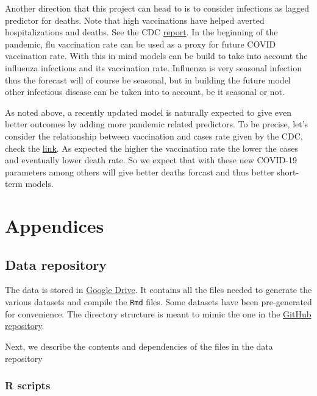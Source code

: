 \documentclass[
]{article}
\begin{document}
Another direction that this project can head to is to consider
infections as lagged predictor for deaths. Note that high vaccinations
have helped averted hospitalizations and deaths. See the CDC
\href{https://www.cdc.gov/flu/about/burden-averted/2019-2020.htm}{report}.
In the beginning of the pandemic, flu vaccination rate can be used as a
proxy for future COVID vaccination rate. With this in mind models can be
build to take into account the influenza infections and its vaccination
rate. Influenza is very seasonal infection thus the forecast will of
course be seasonal, but in building the future model other infectious
disease can be taken into to account, be it seasonal or not.

As noted above, a recently updated model is naturally expected to give
even better outcomes by adding more pandemic related predictors. To be
precise, let's consider the relationship between vaccination and cases
rate given by the CDC, check the
\href{https://covid.cdc.gov/covid-data-tracker/\#vaccination-case-rate}{link}.
As expected the higher the vaccination rate the lower the cases and
eventually lower death rate. So we expect that with these new COVID-19
parameters among others will give better deaths forcast and thus better
short-term models.

\hypertarget{appendices}{%
\section{Appendices}\label{appendices}}

\hypertarget{data-repository}{%
\subsection{Data repository}\label{data-repository}}

The data is stored in
\href{https://drive.google.com/drive/folders/1GYzZ3FuPWtQwTF8-UPQdenm0QWL_u_HH?usp=sharing}{Google
Drive}. It contains all the files needed to generate the various
datasets and compile the \texttt{Rmd} files. Some datasets have been
pre-generated for convenience. The directory structure is meant to mimic
the one in the \href{https://github.com/haerski/mortality}{GitHub
repository}.

Next, we describe the contents and dependencies of the files in the data
repository

\hypertarget{r-scripts}{%
\subsubsection{R scripts}\label{r-scripts}}
\end{document}
